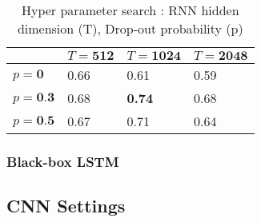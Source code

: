 \begin{table}[H]
\label{tab:a2}
\centering
\begin{tabular}{| p{} | p{}| p{}| p{} |}
\hline
& $T = \textbf{512}$ & $T = \textbf{1024}$ & $T = \textbf{2048}$\\
\hline
$p = \textbf{0}$  & 0.66 & 0.61 & 0.59\\
\hline
$p = \textbf{0.3}$ & 0.68 & \textbf{0.74} & 0.68\\ 
\hline
$p = \textbf{0.5}$ & 0.67 & 0.71 & 0.64\\
\hline
\end{tabular}
\caption{Hyper parameter search : RNN hidden dimension (T), Drop-out probability (p)} 
\end{table}

\subsubsection{Black-box LSTM}

\subsection{CNN Settings}

